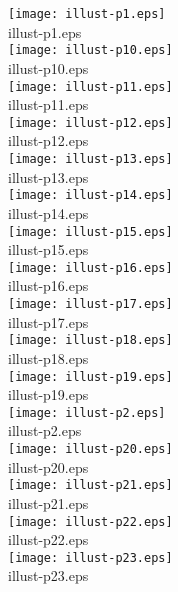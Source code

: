 \texttt{[image: illust-p1.eps]}\\illust-p1.eps\\


\texttt{[image: illust-p10.eps]}\\illust-p10.eps\\


\texttt{[image: illust-p11.eps]}\\illust-p11.eps\\


\texttt{[image: illust-p12.eps]}\\illust-p12.eps\\


\texttt{[image: illust-p13.eps]}\\illust-p13.eps\\


\texttt{[image: illust-p14.eps]}\\illust-p14.eps\\


\texttt{[image: illust-p15.eps]}\\illust-p15.eps\\


\texttt{[image: illust-p16.eps]}\\illust-p16.eps\\


\texttt{[image: illust-p17.eps]}\\illust-p17.eps\\


\texttt{[image: illust-p18.eps]}\\illust-p18.eps\\


\texttt{[image: illust-p19.eps]}\\illust-p19.eps\\


\texttt{[image: illust-p2.eps]}\\illust-p2.eps\\


\texttt{[image: illust-p20.eps]}\\illust-p20.eps\\


\texttt{[image: illust-p21.eps]}\\illust-p21.eps\\


\texttt{[image: illust-p22.eps]}\\illust-p22.eps\\


\texttt{[image: illust-p23.eps]}\\illust-p23.eps\\


